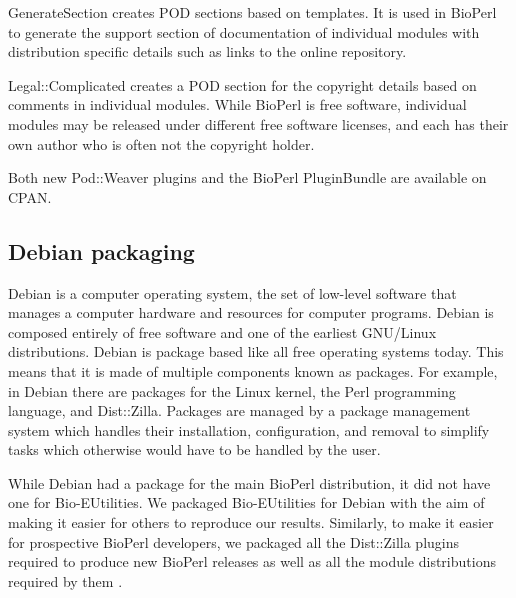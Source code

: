 GenerateSection creates POD sections based on templates.  It is
used in BioPerl to generate the support section of documentation
of individual modules
with distribution specific details such as links to the online
repository.

Legal::Complicated creates a POD section for the copyright details
based on comments in individual modules.  While BioPerl is free
software, individual modules may be released under different free
software licenses, and each has their own author who is often not
the copyright holder.

Both new Pod::Weaver plugins and the BioPerl PluginBundle are available
on CPAN.

\subsection{Debian packaging}

Debian is a computer operating system, the set of low-level software
that manages a computer hardware and resources for computer programs.
Debian is
composed entirely of free software and one of the earliest GNU/Linux
distributions.
Debian is package based like all free operating systems today.
This means that it is made of multiple components known as
packages.  For example, in Debian there are packages for the Linux
kernel, the Perl programming language, and Dist::Zilla.  Packages are
managed by a package management system which handles their
installation, configuration, and removal to simplify tasks which otherwise would
have to be handled by the user.

While Debian had a package for the main BioPerl distribution, it did
not have one for Bio-EUtilities.  We packaged Bio-EUtilities for
Debian with the aim of making it easier for
others to reproduce our results.
Similarly, to make it easier for prospective BioPerl
developers, we packaged all the Dist::Zilla plugins required to produce
new BioPerl releases as well
as all the module distributions required by them
.

